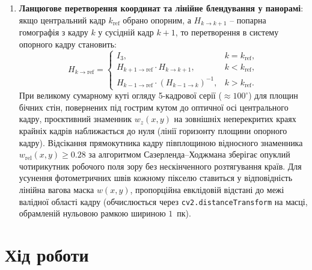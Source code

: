 \documentclass[14pt, a4paper]{extarticle}
\begin{document}
\begin{enumerate}
    \item \textbf{Ланцюгове перетворення координат та лінійне блендування у панорамі}: якщо центральний кадр $k_{\text{ref}}$ обрано опорним, а $H_{k \to k+1}$ -- попарна гомографія з кадру $k$ у сусідній кадр $k+1$, то перетворення в систему опорного кадру становить:
    \begin{equation}\label{eq:chain_homography}
        H_{k \to \text{ref}} = 
        \begin{cases}
            I_3, & k = k_{\text{ref}}, \\
            H_{k+1 \to \text{ref}} \cdot H_{k \to k+1}, & k < k_{\text{ref}}, \\
            H_{k-1 \to \text{ref}} \cdot (H_{k-1 \to k})^{-1}, & k > k_{\text{ref}}.
        \end{cases}
    \end{equation}
    При великому сумарному куті огляду 5-кадрової серії ($\approx 100^\circ$) для площин бічних стін, повернених під гострим кутом до оптичної осі центрального кадру, проєктивний знаменник $w_z(x, y)$ на зовнішніх неперекритих краях крайніх кадрів наближається до нуля (лінії горизонту площини опорного кадру). Відсікання прямокутника кадру півплощиною відносного знаменника $w_{\text{rel}}(x, y) \ge 0.28$ за алгоритмом Сазерленда--Ходжмана зберігає опуклий чотирикутник робочого поля зору без нескінченного розтягування країв. Для усунення фотометричних швів кожному пікселю ставиться у відповідність лінійна вагова маска $w(x, y)$, пропорційна евклідовій відстані до межі валідної області кадру (обчислюється через \texttt{cv2.distanceTransform} на масці, обрамленій нульовою рамкою шириною $1$~пк).
\end{enumerate}

\section{Хід роботи}
\end{document}
